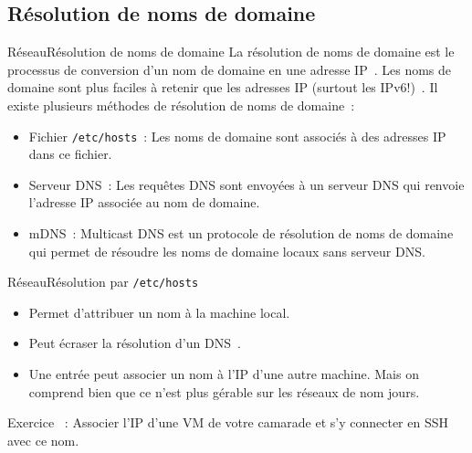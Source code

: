 \documentclass{beamer}
\begin{document}
    \subsection{Résolution de noms de domaine}\label{subsec:domaine-name-resolution}

    \begin{frame}{Réseau}{Résolution de noms de domaine}
        La résolution de noms de domaine est le processus de conversion d'un nom de domaine en une adresse IP~.
        \bigbreak
        Les noms de domaine sont plus faciles à retenir que les adresses IP (surtout les IPv6!)~.
        \bigbreak
        Il existe plusieurs méthodes de résolution de noms de domaine~:
        \begin{itemize}
            \item Fichier \lstinline{/etc/hosts}~: Les noms de domaine sont associés à des adresses IP dans ce fichier.
            \item Serveur DNS~: Les requêtes DNS sont envoyées à un serveur DNS qui renvoie l'adresse IP associée au nom de domaine.
            \item mDNS~: Multicast DNS est un protocole de résolution de noms de domaine qui permet de résoudre les noms de domaine locaux sans serveur DNS.
        \end{itemize}
    \end{frame}

    \begin{frame}{Réseau}{Résolution par \lstinline{/etc/hosts}}
        \begin{itemize}
            \item Permet d'attribuer un nom à la machine local.
            \item Peut écraser la résolution d'un DNS~.
            \item Une entrée peut associer un nom à l'IP d'une autre machine.
            Mais on comprend bien que ce n'est plus gérable sur les réseaux de nom jours.
        \end{itemize}
        \bigbreak
        Exercice \execcounterdispinc~: Associer l'IP d'une VM de votre camarade et s'y connecter en SSH avec ce nom.
    \end{frame}
\end{document}

